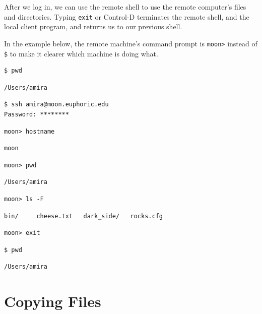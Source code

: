 \documentclass[
]{krantz}
\begin{document}
After we log in,
we can use the remote shell to use the remote computer's files and directories.
Typing \texttt{exit} or Control-D
terminates the remote shell, and the local client program, and returns us to our previous shell.

In the example below,
the remote machine's command prompt is \texttt{moon\textgreater{}}
instead of \texttt{\$} to make it clearer which machine is doing what.

\begin{verbatim}
$ pwd
\end{verbatim}

\begin{verbatim}
/Users/amira
\end{verbatim}

\begin{verbatim}
$ ssh amira@moon.euphoric.edu
Password: ********
\end{verbatim}

\begin{verbatim}
moon> hostname
\end{verbatim}

\begin{verbatim}
moon
\end{verbatim}

\begin{verbatim}
moon> pwd
\end{verbatim}

\begin{verbatim}
/Users/amira
\end{verbatim}

\begin{verbatim}
moon> ls -F
\end{verbatim}

\begin{verbatim}
bin/     cheese.txt   dark_side/   rocks.cfg
\end{verbatim}

\begin{verbatim}
moon> exit
\end{verbatim}

\begin{verbatim}
$ pwd
\end{verbatim}

\begin{verbatim}
/Users/amira
\end{verbatim}

\hypertarget{ssh-cp}{%
\section{Copying Files}\label{ssh-cp}}
\end{document}
